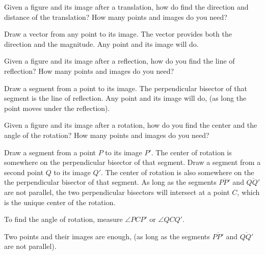 \documentclass[nooutcomes]{ximera}
\begin{document}
\begin{question}
Given a figure and its image after a translation, how do find the direction and distance of the translation?    How many points and images do you need?  
\begin{freeResponse}
\begin{hint}
Draw a vector from any point to its image.  The vector provides both the direction and the magnitude.  Any point and its image will do.  
\end{hint}
\end{freeResponse}
\end{question}

\begin{question}
Given a figure and its image after a reflection, how do you find the line of reflection?  How many points and images do you need?  
\begin{freeResponse}
\begin{hint}
Draw a segment from a point to its image.  The perpendicular bisector of that segment is the line of reflection.  Any point and its image will do, (as long the point moves under the reflection).  
\end{hint}
\end{freeResponse}
\end{question}

\begin{question}
Given a figure and its image after a rotation, how do you find the center and the angle of the rotation?  How many points and images do you need?  
\begin{freeResponse}
\begin{hint}
Draw a segment from a point $P$ to its image $P'$.  The center of rotation is somewhere on the perpendicular bisector of that segment.  Draw a segment from a second point $Q$ to its image $Q'$.  The center of rotation is also somewhere on the the perpendicular bisector of that segment.  As long as the segments $\overline{PP'}$ and $\overline{QQ'}$ are not parallel, the two perpendicular bisectors will intersect at a point $C$, which is the unique center of the rotation.  

To find the angle of rotation, measure $\angle PCP'$ or $\angle QCQ'$.

Two points and their images are enough, (as long as the segments $\overline{PP'}$ and $\overline{QQ'}$ are not parallel). 
\end{hint}
\end{freeResponse}
\end{question}
\end{document}

